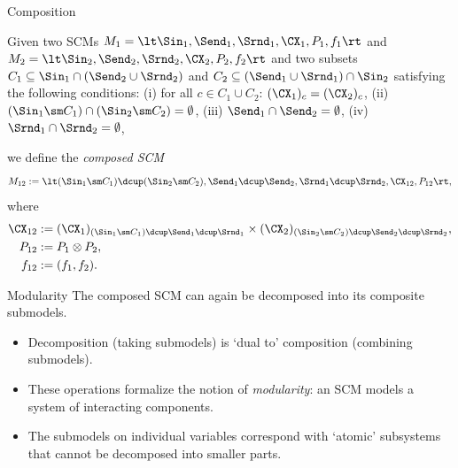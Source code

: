 \begin{frame}{Composition}
\begin{Def}[\ref{def:compose_scm}]
  Given two SCMs $M_1 = \lt \Sin_1, \Send_1, \Srnd_1, \CX_1, P_1, f_1 \rt$ and $M_2 = \lt \Sin_2, \Send_2, \Srnd_2, \CX_2, P_2, f_2 \rt$ and two subsets $C_1 \subseteq \Sin_1 \cap (\Send_2 \cup \Srnd_2)$ and $C_2 \subseteq (\Send_1 \cup \Srnd_1) \cap \Sin_2$ satisfying the following conditions:
  (i) for all $c \in C_1 \cup C_2$: $(\CX_1)_c = (\CX_2)_c$,
  (ii) $(\Sin_1 \sm C_1) \cap (\Sin_2 \sm C_2) = \emptyset$,
  (iii) $\Send_1 \cap \Send_2 = \emptyset$,
  (iv) $\Srnd_1 \cap \Srnd_2 = \emptyset$,

  we define the \emph{composed SCM}
  $$M_{12} := \lt (\Sin_1 \sm C_1) \dcup (\Sin_2 \sm C_2), \Send_1 \dcup \Send_2, \Srnd_1 \dcup \Srnd_2, \CX_{12}, P_{12} \rt,$$
  where
  \begin{align*}
    \CX_{12} &:= (\CX_1)_{(\Sin_1 \sm C_1) \dcup \Send_1 \dcup \Srnd_1} \times (\CX_2)_{(\Sin_2 \sm C_2) \dcup \Send_2 \dcup \Srnd_2}, \\
    P_{12} &:= P_1 \otimes P_2, \\
    f_{12} &:= (f_1, f_2).
  \end{align*}
\end{Def}
\end{frame}

\begin{frame}{Modularity}
  The composed SCM can again be decomposed into its composite submodels.

  \bigskip
  \bigskip
  \begin{itemize}
    \item Decomposition (taking submodels) is `dual to' composition (combining submodels).
    \item These operations formalize the notion of \emph{modularity}: an SCM models a system of interacting components.
    \item The submodels on individual variables correspond with `atomic' subsystems that cannot be decomposed into smaller parts.
  \end{itemize}
\end{frame}


